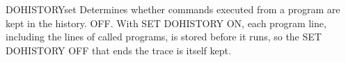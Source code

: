 \begin{XbaseEntry}{DOHISTORY}{set}
Determines whether commands executed from a program are kept in the history.
\Syntax
{}
\Defaults
OFF.
\Usage
With SET DOHISTORY ON, each program line, including the lines of called
programs, is stored before it runs, so the SET DOHISTORY OFF that ends the
trace is itself kept.
\end{XbaseEntry}
